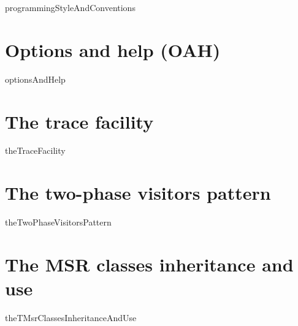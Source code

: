 \documentclass[12pt,a4paper]{article}
\begin{document}
{programmingStyleAndConventions}


\section{Options and help (OAH)}

{optionsAndHelp}


\section{The trace facility}

{theTraceFacility}


\section{The two-phase visitors pattern}

{theTwoPhaseVisitorsPattern}


\section{The MSR classes inheritance and use}

{theTMsrClassesInheritanceAndUse}


\end{document}
